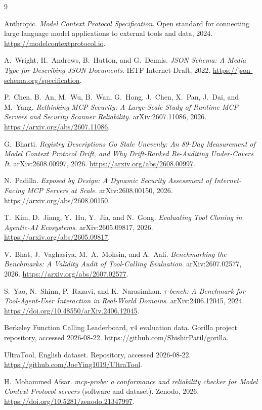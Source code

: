 \documentclass[11pt]{article}
\begin{document}
\begin{thebibliography}{9}

Anthropic.
\newblock \emph{Model Context Protocol Specification}.
\newblock Open standard for connecting large language model applications to
  external tools and data, 2024.
\newblock \url{https://modelcontextprotocol.io}.

A.~Wright, H.~Andrews, B.~Hutton, and G.~Dennis.
\newblock \emph{JSON Schema: A Media Type for Describing JSON Documents}.
\newblock IETF Internet-Draft, 2022.
\newblock \url{https://json-schema.org/specification}.

P.~Chen, B.~An, M.~Wu, B.~Wan, G.~Hong, J.~Chen, X.~Pan, J.~Dai, and M.~Yang.
\newblock \emph{Rethinking MCP Security: A Large-Scale Study of Runtime MCP
  Servers and Security Scanner Reliability}.
\newblock arXiv:2607.11086, 2026.
\newblock \url{https://arxiv.org/abs/2607.11086}.

G.~Bharti.
\newblock \emph{Registry Descriptions Go Stale Unevenly: An 89-Day Measurement
  of Model Context Protocol Drift, and Why Drift-Ranked Re-Auditing
  Under-Covers It}.
\newblock arXiv:2608.00997, 2026.
\newblock \url{https://arxiv.org/abs/2608.00997}.

N.~Padilla.
\newblock \emph{Exposed by Design: A Dynamic Security Assessment of
  Internet-Facing MCP Servers at Scale}.
\newblock arXiv:2608.00150, 2026.
\newblock \url{https://arxiv.org/abs/2608.00150}.

T.~Kim, D.~Jiang, Y.~Hu, Y.~Jia, and N.~Gong.
\newblock \emph{Evaluating Tool Cloning in Agentic-AI Ecosystems}.
\newblock arXiv:2605.09817, 2026.
\newblock \url{https://arxiv.org/abs/2605.09817}.

V.~Bhat, J.~Vaghasiya, M.~A.~Mohsin, and A.~Aali.
\newblock \emph{Benchmarking the Benchmarks: A Validity Audit of Tool-Calling
  Evaluation}.
\newblock arXiv:2607.02577, 2026.
\newblock \url{https://arxiv.org/abs/2607.02577}.

S.~Yao, N.~Shinn, P.~Razavi, and K.~Narasimhan.
\newblock \emph{$\tau$-bench: A Benchmark for Tool-Agent-User Interaction in
  Real-World Domains}.
\newblock arXiv:2406.12045, 2024.
\newblock \url{https://doi.org/10.48550/arXiv.2406.12045}.

Berkeley Function Calling Leaderboard, v4 evaluation data.
\newblock Gorilla project repository, accessed 2026-08-22.
\newblock \url{https://github.com/ShishirPatil/gorilla}.

UltraTool, English dataset.
\newblock Repository, accessed 2026-08-22.
\newblock \url{https://github.com/JoeYing1019/UltraTool}.

H.~Mohammed Afsar.
\newblock \emph{mcp-probe: a conformance and reliability checker for Model
  Context Protocol servers} (software and dataset).
\newblock Zenodo, 2026.
\newblock \url{https://doi.org/10.5281/zenodo.21347997}.

\end{thebibliography}
\end{document}
